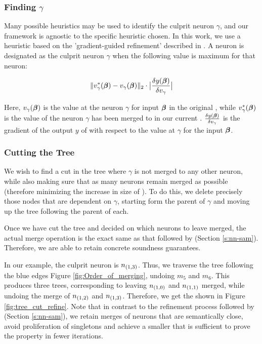 \subsubsection{Finding $\gamma$}

Many possible heuristics may be used to identify the culprit neuron $\gamma$,
and our framework is agnostic to the specific heuristic chosen. In this work, we
use a heuristic based on the 'gradient-guided refinement' described in
\cite{lin-comb-abs-jan}. A neuron is designated as the culprit neuron $\gamma$
when the following value is maximum for that neuron: 

\begin{equation*}
\begin{aligned}
    \|v^{*}_{\gamma}(\boldsymbol{\beta}) - v_{\gamma}(\boldsymbol{\beta})\|_{2} \cdot 
    \big| \frac{\delta y(\boldsymbol{\beta})}{\delta v_{\gamma}} \big|
\end{aligned}
\end{equation*}

Here, $v_{\gamma}(\boldsymbol{\beta})$ is the value at the neuron $\gamma$ for input
$\boldsymbol{\beta}$ in the original \cnc, while $v^{*}_{\gamma}(\boldsymbol{\beta})$ is the
value of the neuron $\gamma$ has been merged to in our current \abs.
$\frac{\delta y(\boldsymbol{\beta})}{\delta v_{\gamma}}$ is the gradient of the output
$y$ of \cnc with respect to the value at $\gamma$ for the input $\boldsymbol{\beta}$.

\subsubsection{Cutting the Tree}

We wish to find a cut in the tree where $\gamma$ is not merged to any other
neuron, while also making sure that as many neurons remain merged as possible
(therefore minimizing the increase in size of \abs). To do this, we delete
precisely those nodes that are dependent on $\gamma$, starting form the parent
of $\gamma$ and moving up the tree following the parent of each.

Once we have cut the tree and decided on which neurons to leave merged, the
actual merge operation is the exact same as that followed by \cite{cegar-nn}
(Section \ref{s:nn-sam}). Therefore, we are able to retain concrete soundness
guarantees.

In our example, the culprit neuron is $n_{(1,3)}$. Thus, we traverse the tree
following the blue edges Figure \ref{fig:Order_of_merging}, undoing $m_5$ and
$m_6$. This produces three trees, corresponding to leaving $n_{(1,0)}$ and
$n_{(1,1)}$ merged, while undoing the merge of $n_{(1,2)}$ and $n_{(1,3)}$.
Therefore, we get the \abs shown in Figure \ref{fig:tree_cut_refine}. Note
that in contrast to the refinement process followed by \cite{cegar-nn} (Section
\ref{s:nn-sam}), we retain merges of neurons that are semantically close, avoid
proliferation of singletons and achieve a smaller \abs that is sufficient to
prove the property in fewer iterations.

